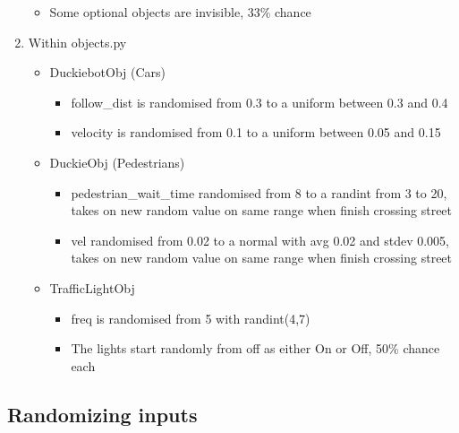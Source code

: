 \begin{enumerate}
\begin{itemize}
            \item Some optional objects are invisible, 33\% chance
        \end{itemize}
    \item Within objects.py
        \begin{itemize}
            \item DuckiebotObj (Cars)
                \begin{itemize}
                    \item follow\_dist is randomised from 0.3 to a uniform between 0.3 and 0.4
                    \item velocity is randomised from 0.1 to a uniform between 0.05 and 0.15
                \end{itemize}
            \item DuckieObj (Pedestrians)
                \begin{itemize}
                    \item pedestrian\_wait\_time randomised from 8 to a randint from 3 to 20, takes on new random value on same range when finish crossing street
                    \item vel randomised from 0.02 to a normal with avg 0.02 and stdev 0.005, takes on new random value on same range when finish crossing street
                \end{itemize}
            \item TrafficLightObj
                \begin{itemize}
                    \item freq is randomised from 5 with randint(4,7)
                    \item The lights start randomly from off as either On or Off, 50\% chance each
                \end{itemize}
        \end{itemize}
\end{enumerate}


\subsection{Randomizing inputs}



